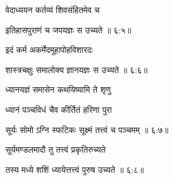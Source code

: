 {\devanagarifont वेदाध्ययन कर्तव्यं शिवसंहितमेव च  \danda\dontdisplaylinenum }%


{\devanagarifont इतिहासपुराणं च जपयज्ञः स उच्यते {॥ ६:५॥} \veg\dontdisplaylinenum }%



{\devanagarifont इदं कर्म अकर्मेदमूहापोहविशारदः \thinspace{\dandab} \dontdisplaylinenum }%


{\devanagarifont शास्त्रचक्षुः समालोक्य ज्ञानयज्ञः स उच्यते {॥ ६:६॥} \veg\dontdisplaylinenum }%



{\devanagarifont ध्यानयज्ञं समासेन कथयिष्यामि ते शृणु \thinspace{\dandab} \dontdisplaylinenum }%

{\devanagarifont ध्यानं पञ्चविधं चैव कीर्तितं हरिणा पुरा  \danda\dontdisplaylinenum }%


{\devanagarifont सूर्यः सोमो ऽग्नि स्फटिकः सूक्ष्मं तत्त्वं च पञ्चमम् {॥ ६:७॥} \veg\dontdisplaylinenum }%

{\devanagarifont सूर्यमण्डलमादौ तु तत्त्वं प्रकृतिरुच्यते \thinspace{\dandab} \dontdisplaylinenum }%
 

{\devanagarifont तस्य मध्ये शशिं ध्यायेत्तत्त्वं पुरुष उच्यते {॥ ६:८॥} \veg\dontdisplaylinenum }%

